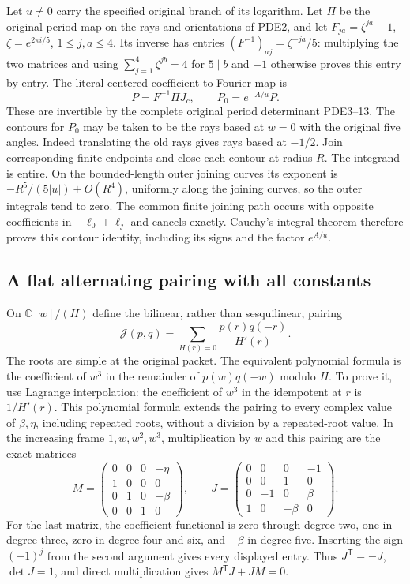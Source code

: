 \documentclass[11pt,a4paper]{article}
\begin{document}
Let $u\ne0$ carry the specified original branch of its logarithm.
Let $\Pi$ be the original period map on the rays and orientations
of PDE2, and let $F_{ja}=\zeta^{ja}-1$, $\zeta=e^{2\pi i/5}$,
$1\leq j,a\leq4$. Its inverse has entries
$(F^{-1})_{aj}=\zeta^{-ja}/5$: multiplying the two matrices and using
$\sum_{j=1}^4\zeta^{jb}=4$ for $5\mid b$ and $-1$ otherwise proves
this entry by entry. The literal centered coefficient-to-Fourier map is
\[
 P=F^{-1}\Pi J_c,\qquad P_0=e^{-A/u}P.
 \tag{RPC3}
\]
These are invertible by the complete original period determinant
PDE3--13. The contours for $P_0$ may be taken to be the rays based at
$w=0$ with the original five angles. Indeed translating the old rays
gives rays based at $-1/2$. Join corresponding finite endpoints and
close each contour at radius $R$. The integrand is entire. On the
bounded-length outer joining curves its exponent is
$-R^5/(5|u|)+O(R^4)$, uniformly along the joining curves, so the
outer integrals tend to zero. The common finite joining path occurs
with opposite coefficients in $-\ell_0+\ell_j$ and cancels exactly.
Cauchy's integral theorem therefore proves this contour identity,
including its signs and the factor $e^{A/u}$.

\subsection{A flat alternating pairing with all constants}

On $\mathbb C[w]/(H)$ define the bilinear, rather than sesquilinear,
pairing
\[
 \mathcal J(p,q)=\sum_{H(r)=0}\frac{p(r)q(-r)}{H'(r)}.
 \tag{RPC4}
\]
The roots are simple at the original packet. The equivalent polynomial
formula is the coefficient of $w^3$ in the remainder of $p(w)q(-w)$
modulo $H$. To prove it, use Lagrange interpolation: the coefficient
of $w^3$ in the idempotent at $r$ is $1/H'(r)$. This polynomial
formula extends the pairing to every complex value of $\beta,\eta$,
including repeated roots, without a division by a repeated-root value.
In the increasing frame $1,w,w^2,w^3$, multiplication by $w$ and
this pairing are the exact matrices
\[
 M=\begin{pmatrix}0&0&0&-\eta\\1&0&0&0\\0&1&0&-\beta\\0&0&1&0\end{pmatrix},
 \qquad
 J=\begin{pmatrix}0&0&0&-1\\0&0&1&0\\0&-1&0&\beta\\1&0&-\beta&0\end{pmatrix}.
 \tag{RPC5}
\]
For the last matrix, the coefficient functional is zero through degree
two, one in degree three, zero in degree four and six, and $-\beta$
in degree five. Inserting the sign $(-1)^j$ from the second argument
gives every displayed entry. Thus $J^{\mathsf T}=-J$, $\det J=1$,
and direct multiplication gives $M^{\mathsf T}J+JM=0$.
\end{document}
